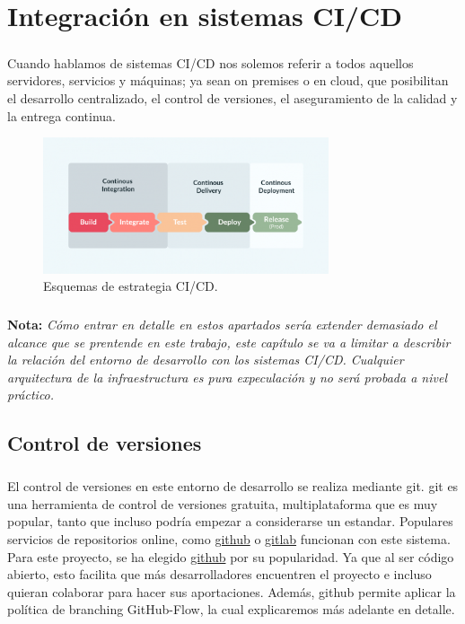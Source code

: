 \chapter{Integración en sistemas CI/CD}\label{sec:cicd}

\paragraph{}Cuando hablamos de sistemas \gls{CI/CD} nos solemos referir a todos aquellos
servidores, servicios y máquinas; ya sean \gls{on premises} o en cloud, que posibilitan
el desarrollo centralizado, el control de versiones, el aseguramiento de la calidad
y la entrega continua.

\begin{figure}[H]
    \centering
    \includegraphics[width=0.75\textwidth]{imgs/cicd}
    \caption{Esquemas de estrategia CI/CD.}
    \label{imgs:cicd}
\end{figure}


\paragraph{}\textbf{Nota: }\emph{Cómo entrar en detalle en estos apartados sería extender
demasiado el alcance que se prentende en este trabajo, este capítulo se va a limitar a
describir la relación del entorno de desarrollo con los sistemas \gls{CI/CD}. Cualquier
arquitectura de la infraestructura es pura expeculación y no será probada a nivel práctico.}

\section{Control de versiones}

\paragraph{}El control de versiones en este entorno de desarrollo se realiza mediante
\gls{git}. \Gls{git} es una herramienta de control de versiones gratuita, multiplataforma que
es muy popular, tanto que incluso podría empezar a considerarse un estandar. Populares
servicios de repositorios online, como \href{github.com}{github} o \href{gitlab.com}{gitlab}
funcionan con este sistema. Para este proyecto, se ha elegido \href{github.com}{github}
por su popularidad. Ya que al ser código abierto, esto facilita que más desarrolladores
encuentren el proyecto e incluso quieran colaborar para hacer sus aportaciones. Además,
github permite aplicar la política de branching GitHub-Flow, la cual explicaremos más
adelante en detalle.

